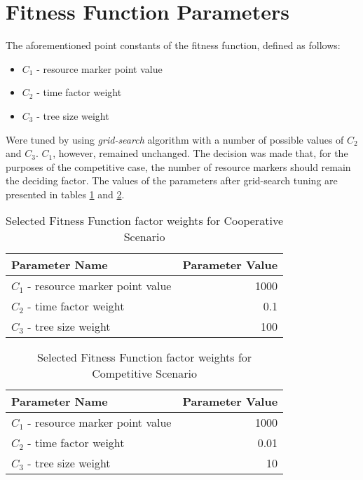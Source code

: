 \section{Fitness Function Parameters}
The aforementioned point constants of the fitness function, defined as follows:
\begin{itemize}
    \item $C_1$ - resource marker point value
    \item $C_2$ - time factor weight
    \item $C_3$ - tree size weight
\end{itemize}
Were tuned by using \textit{grid-search} algorithm with a number of possible values of $C_2$ and $C_3$. $C_1$, however, remained unchanged. The decision was made that, for the purposes of the competitive case, the number of resource markers should remain the deciding factor.
The values of the parameters after grid-search tuning are presented in tables \ref{table:x tunedfitnessfunctionparameterscoop} and \ref{table:x tunedfitnessfunctionparameterscomp}.
\begin{table} [h]
    \centering
    \begin{tabular} {l r}
        \hline \hline
        Parameter Name & Parameter Value \\
        \hline
        $C_1$ - resource marker point value & 1000 \\
        $C_2$ - time factor weight & 0.1 \\
        $C_3$ - tree size weight & 100 \\
    \end{tabular}
    \caption{Selected Fitness Function factor weights for Cooperative Scenario}
    \label{table:x tunedfitnessfunctionparameterscoop}
\end{table}


\begin{table} [h]
    \centering
    \begin{tabular} {l r}
        \hline \hline
        Parameter Name & Parameter Value \\
        \hline
        $C_1$ - resource marker point value & 1000 \\
        $C_2$ - time factor weight & 0.01 \\
        $C_3$ - tree size weight & 10 \\
    \end{tabular}
    \caption{Selected Fitness Function factor weights for Competitive Scenario}
    \label{table:x tunedfitnessfunctionparameterscomp}
\end{table}
